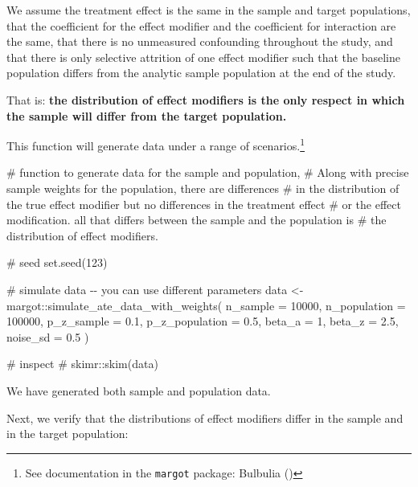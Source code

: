 \documentclass[
  single column]{article}
\newenvironment{Shaded}{\begin{snugshade}}{\end{snugshade}}
\newcommand{\AttributeTok}[1]{\textcolor[rgb]{0.40,0.45,0.13}{#1}}
\newcommand{\CommentTok}[1]{\textcolor[rgb]{0.37,0.37,0.37}{#1}}
\newcommand{\DecValTok}[1]{\textcolor[rgb]{0.68,0.00,0.00}{#1}}
\newcommand{\FloatTok}[1]{\textcolor[rgb]{0.68,0.00,0.00}{#1}}
\newcommand{\FunctionTok}[1]{\textcolor[rgb]{0.28,0.35,0.67}{#1}}
\newcommand{\NormalTok}[1]{\textcolor[rgb]{0.00,0.23,0.31}{#1}}
\newcommand{\OtherTok}[1]{\textcolor[rgb]{0.00,0.23,0.31}{#1}}
\newcommand{\SpecialCharTok}[1]{\textcolor[rgb]{0.37,0.37,0.37}{#1}}
\begin{document}
We assume the treatment effect is the same in the sample and target
populations, that the coefficient for the effect modifier and the
coefficient for interaction are the same, that there is no unmeasured
confounding throughout the study, and that there is only selective
attrition of one effect modifier such that the baseline population
differs from the analytic sample population at the end of the study.

That is: \textbf{the distribution of effect modifiers is the only
respect in which the sample will differ from the target population.}

This function will generate data under a range of scenarios.\footnote{See
  documentation in the \texttt{margot} package: Bulbulia
  ()}

\begin{Shaded}
\begin{Highlighting}[]
\CommentTok{\# function to generate data for the sample and population, }
\CommentTok{\# Along with precise sample weights for the population, there are differences }
\CommentTok{\# in the distribution of the true effect modifier but no differences in the treatment effect }
\CommentTok{\# or the effect modification. all that differs between the sample and the population is }
\CommentTok{\# the distribution of effect modifiers.}

\CommentTok{\# seed}
\FunctionTok{set.seed}\NormalTok{(}\DecValTok{123}\NormalTok{)}

\CommentTok{\# simulate data {-}{-} you can use different parameters}
\NormalTok{data }\OtherTok{\textless{}{-}}\NormalTok{ margot}\SpecialCharTok{::}\FunctionTok{simulate\_ate\_data\_with\_weights}\NormalTok{(}
  \AttributeTok{n\_sample =} \DecValTok{10000}\NormalTok{,}
  \AttributeTok{n\_population =} \DecValTok{100000}\NormalTok{,}
  \AttributeTok{p\_z\_sample =} \FloatTok{0.1}\NormalTok{,}
  \AttributeTok{p\_z\_population =} \FloatTok{0.5}\NormalTok{,}
  \AttributeTok{beta\_a =} \DecValTok{1}\NormalTok{,}
  \AttributeTok{beta\_z =} \FloatTok{2.5}\NormalTok{,}
  \AttributeTok{noise\_sd =} \FloatTok{0.5}
\NormalTok{)}

\CommentTok{\# inspect}
\CommentTok{\# skimr::skim(data)}
\end{Highlighting}
\end{Shaded}

We have generated both sample and population data.

Next, we verify that the distributions of effect modifiers differ in the
sample and in the target population:
\end{document}

